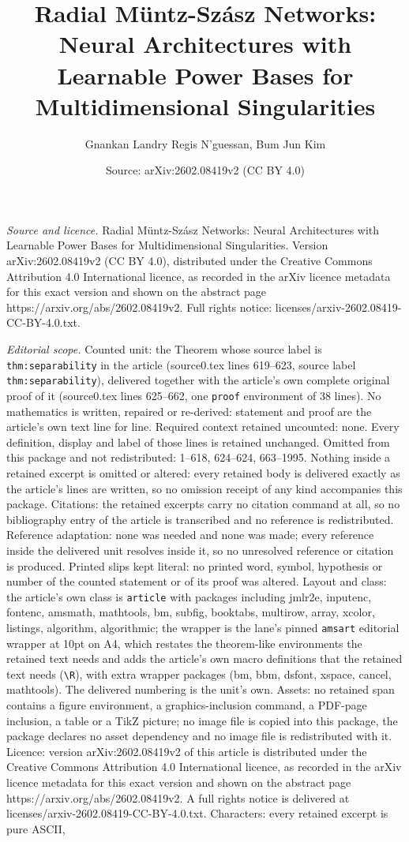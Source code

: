 \documentclass[10pt,a4paper]{amsart}
\title[Radial M\"untz-Sz\'asz Networks: Neural Architectures with L]{Radial M\"untz-Sz\'asz Networks: Neural Architectures with Learnable Power Bases for Multidimensional Singularities}
\author{Gnankan Landry Regis N'guessan, Bum Jun Kim}
\date{Source: arXiv:2602.08419v2 (CC BY 4.0)}
\begin{document}
\maketitle

\noindent\emph{Source and licence.} Radial M\"untz-Sz\'asz Networks: Neural Architectures with Learnable Power Bases for Multidimensional Singularities. Version arXiv:2602.08419v2 (CC BY 4.0), distributed under the Creative Commons Attribution 4.0 International licence, as recorded in the arXiv licence metadata for this exact version and shown on the abstract page https://arxiv.org/abs/2602.08419v2. Full rights notice: licenses/arxiv-2602.08419-CC-BY-4.0.txt.\par\smallskip

\noindent\textit{Editorial scope.} Counted unit: the Theorem whose source label is \texttt{thm:separability} in the article (source0.tex lines 619--623, source label \texttt{thm:separability}), delivered together with the article's own complete original proof of it (source0.tex lines 625--662, one \texttt{proof} environment of 38 lines). No mathematics is written, repaired or re-derived: statement and proof are the article's own text line for line. Required context retained uncounted: none. Every definition, display and label of those lines is retained unchanged. Omitted from this package and not redistributed: 1--618, 624--624, 663--1995. Nothing inside a retained excerpt is omitted or altered: every retained body is delivered exactly as the article's lines are written, so no omission receipt of any kind accompanies this package. Citations: the retained excerpts carry no citation command at all, so no bibliography entry of the article is transcribed and no reference is redistributed. Reference adaptation: none was needed and none was made; every reference inside the delivered unit resolves inside it, so no unresolved reference or citation is produced. Printed slips kept literal: no printed word, symbol, hypothesis or number of the counted statement or of its proof was altered. Layout and class: the article's own class is \texttt{article} with packages including jmlr2e, inputenc, fontenc, amsmath, mathtools, bm, subfig, booktabs, multirow, array, xcolor, listings, algorithm, algorithmic; the wrapper is the lane's pinned \texttt{amsart} editorial wrapper at 10pt on A4, which restates the theorem-like environments the retained text needs and adds the article's own macro definitions that the retained text needs (\texttt{\textbackslash R}), with extra wrapper packages (bm, bbm, dsfont, xspace, cancel, mathtools). The delivered numbering is the unit's own. Assets: no retained span contains a figure environment, a graphics-inclusion command, a PDF-page inclusion, a table or a TikZ picture; no image file is copied into this package, the package declares no asset dependency and no image file is redistributed with it. Licence: version arXiv:2602.08419v2 of this article is distributed under the Creative Commons Attribution 4.0 International licence, as recorded in the arXiv licence metadata for this exact version and shown on the abstract page https://arxiv.org/abs/2602.08419v2. A full rights notice is delivered at licenses/arxiv-2602.08419-CC-BY-4.0.txt. Characters: every retained excerpt is pure ASCII, 
\end{document}

